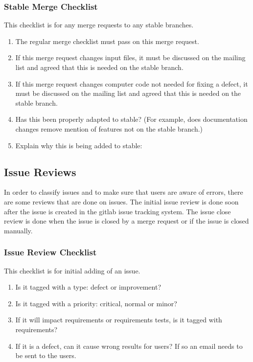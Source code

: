 \documentclass{article}
\begin{document}
\subsubsection{Stable Merge Checklist}

This checklist is for any merge requests to any stable branches.

\begin{enumerate}
\item  The regular merge checklist must pass on this merge request.
\item  If this merge request changes input files, it must be discussed on the mailing list and agreed that this is needed on the stable branch.
\item  If this merge request changes computer code not needed for fixing a defect, it must be discussed on the mailing list and agreed that this is needed on the stable branch.
\item  Has this been properly adapted to stable? (For example, does documentation changes remove mention of features not on the stable branch.)
\item  Explain why this is being added to stable:
\end{enumerate}

\subsection{Issue Reviews}

In order to classify issues and to make sure that users are aware of
errors, there are some reviews that are done on issues.  The initial
issue review is done soon after the issue is created in the gitlab
issue tracking system.  The issue close review is done when the issue
is closed by a merge request or if the issue is closed manually.

\subsubsection{Issue Review Checklist}

This checklist is for initial adding of an issue.

\begin{enumerate}
\item  Is it tagged with a type: defect or improvement?
\item  Is it tagged with a priority: critical, normal or minor?
\item  If it will impact requirements or requirements tests, is it tagged with requirements?
\item  If it is a defect, can it cause wrong results for users? If so an email needs to be sent to the users.
\end{enumerate}
\end{document}
